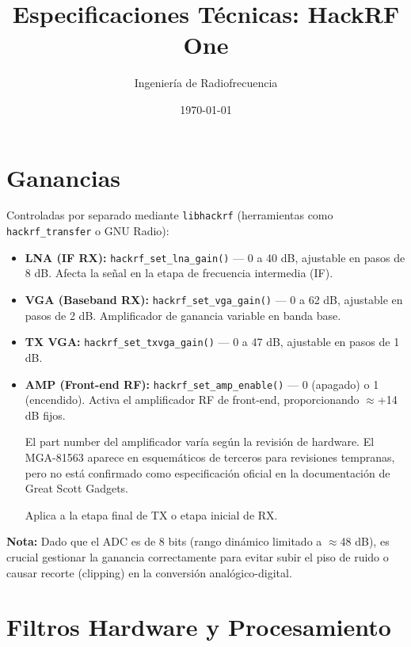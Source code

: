 \documentclass[11pt]{article}
\title{Especificaciones Técnicas: HackRF One}
\author{Ingeniería de Radiofrecuencia}
\date{\today}
\begin{document}
\maketitle
\tableofcontents
\newpage

\section{Ganancias}

Controladas por separado mediante \texttt{libhackrf} (herramientas como \texttt{hackrf\_transfer} o GNU Radio):

\begin{itemize}
    \item \textbf{LNA (IF RX):} \texttt{hackrf\_set\_lna\_gain()} — 0 a 40 dB, ajustable en pasos de 8 dB. Afecta la señal en la etapa de frecuencia intermedia (IF).
    \item \textbf{VGA (Baseband RX):} \texttt{hackrf\_set\_vga\_gain()} — 0 a 62 dB, ajustable en pasos de 2 dB. Amplificador de ganancia variable en banda base.
    \item \textbf{TX VGA:} \texttt{hackrf\_set\_txvga\_gain()} — 0 a 47 dB, ajustable en pasos de 1 dB.
    \item \textbf{AMP (Front-end RF):} \texttt{hackrf\_set\_amp\_enable()} — 0 (apagado) o 1 (encendido). Activa el amplificador RF de front-end, proporcionando $\approx$+14 dB fijos.
    \begin{pendiente}
    El part number del amplificador varía según la revisión de hardware. El MGA-81563 aparece en esquemáticos de terceros para revisiones tempranas, pero no está confirmado como especificación oficial en la documentación de Great Scott Gadgets.
    \end{pendiente}
    Aplica a la etapa final de TX o etapa inicial de RX.
\end{itemize}

\textbf{Nota:} Dado que el ADC es de 8 bits (rango dinámico limitado a $\approx$48 dB), es crucial gestionar la ganancia correctamente para evitar subir el piso de ruido o causar recorte (clipping) en la conversión analógico-digital.

\section{Filtros Hardware y Procesamiento}
\end{document}
